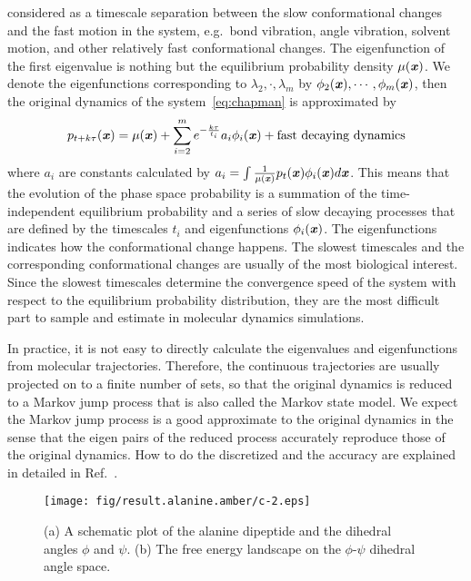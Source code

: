 \documentclass[aip,jcp,a4paper,preprint,unsortedaddress,onecolumn,fleqn]{revtex4-1}
\newcommand{\vect}[1]{\textbf{\textit{#1}}}
\begin{document}
considered as a timescale separation between the slow conformational
changes and the fast motion in the system, e.g.~bond vibration, angle
vibration, solvent motion, and other relatively fast conformational
changes. The eigenfunction of the first eigenvalue is nothing but the
equilibrium probability density $\mu(\vect x)$. We denote the
eigenfunctions corresponding to $\lambda_2, \cdot, \lambda_m$ by
$\phi_2(\vect x), \cdots, \phi_m(\vect x)$, then the original dynamics
of the system~\eqref{eq:chapman} is approximated by
\begin{equation}
  \label{eq:app-dynamics}
  p_{t+k\tau}(\vect x) = \mu(\vect x) + \sum_{i=2}^m e^{-\frac{k\tau}{t_i}} a_i \phi_i(\vect x) + \textrm{fast decaying dynamics}
\end{equation}
where $a_i$ are constants calculated by $a_i = \int \frac{1}{\mu(\vect
  x)} p_t(\vect x)\phi_i(\vect x) d\vect x$. This means that the
evolution of the phase space probability is a summation of the
time-independent equilibrium probability and a series of slow decaying
processes that are defined by the timescales $t_i$ and eigenfunctions
$\phi_i(\vect x)$. The eigenfunctions indicates how the conformational
change happens.
The slowest timescales and the corresponding conformational
changes are usually of the most biological interest.  Since the
slowest timescales determine the convergence speed of the system with
respect to the equilibrium probability distribution, they are the most
difficult part to sample and estimate in molecular dynamics
simulations.

In practice, it is not easy to directly calculate the eigenvalues and
eigenfunctions from molecular trajectories. Therefore, the continuous
trajectories are usually projected on to a finite number of sets, so
that the original dynamics is reduced to a Markov jump process that is
also called the Markov state model. We expect the Markov jump process
is a good approximate to the original dynamics in the sense that the
eigen pairs of the reduced process accurately reproduce those of the
original dynamics. How to do the discretized and the accuracy are
explained in detailed in Ref.~\cite{prinz2011markov}.

\begin{figure}
  \centering  
  \texttt{[image: fig/result.alanine.amber/c-2.eps]}
  \caption{(a) A schematic plot of the alanine dipeptide and the
    dihedral angles $\phi$ and $\psi$. (b) The free energy landscape on the
    $\phi$-$\psi$ dihedral angle space.}
  \label{fig:free-energy}
\end{figure}
\end{document}
